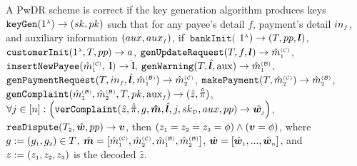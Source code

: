 \begin{definition}[Correctness] A PwDR scheme is correct if the key generation algorithm produces keys $\mathtt{keyGen}(1^{\scriptscriptstyle \lambda})\rightarrow (sk,pk)$ such that for any payee's detail $f$, payment's detail $in_{\scriptscriptstyle f}$, and auxiliary information $(aux, aux_{\scriptscriptstyle f})$, if $\ \mathtt{bankInit}($ $1^{\scriptscriptstyle \lambda})\rightarrow (T, pp, \bm{l})$, $\mathtt{customerInit} (1^{\scriptscriptstyle \lambda}, T, pp)\rightarrow a$, $\mathtt{genUpdateRequest}(T, f, {\bm l})\rightarrow \hat m^{\scriptscriptstyle\mathcal{(C)}}_{\scriptscriptstyle 1}$, $\mathtt{insertNewPayee}(\hat{m}^{\scriptscriptstyle\mathcal{(C)}}_{\scriptscriptstyle 1}, $ ${\bm l})\rightarrow  \hat{\bm l}$, $\mathtt{genWarning}(T, \hat{\bm l}, \text{aux})\rightarrow \hat m^{\scriptscriptstyle\mathcal{(B)}}_{\scriptscriptstyle1}$, $\mathtt{genPaymentRequest}(T, in_{\scriptscriptstyle f}, \hat{\bm{l}}, \hat m^{\scriptscriptstyle\mathcal{(B)}}_{\scriptscriptstyle1})\rightarrow \hat m^{\scriptscriptstyle\mathcal{(C)}}_{\scriptscriptstyle2}$, $\mathtt{makePayment}(T, \hat m^{\scriptscriptstyle\mathcal{(C)}}_{\scriptscriptstyle2})\rightarrow \hat m^{\scriptscriptstyle\mathcal{(B)}}_{\scriptscriptstyle2}$, $\mathtt{genComplaint}(\hat m^{\scriptscriptstyle\mathcal{(B)}}_{\scriptscriptstyle 1}, \hat m^{\scriptscriptstyle\mathcal{(B)}}_{\scriptscriptstyle2}, T, pk, \text{aux}_{\scriptscriptstyle f})\rightarrow (\hat z, \hat{\ddot \pi})$, 
$\forall j\in [n]:\\ \Big(\mathtt{verComplaint}( \hat z, \hat{\ddot{\pi}}, g, \bm{\hat{m}}, \hat{\bm{l}}, j, sk_{\scriptscriptstyle\mathcal D}, aux, pp)\rightarrow \hat{\bm{w}_{\scriptscriptstyle j}}\Big)$, 
 $\mathtt{resDispute}(T_{\scriptscriptstyle 2}, \hat {\bm w}, pp)\rightarrow {\bm v}$, then $(z_{\scriptscriptstyle 1}=z_{\scriptscriptstyle 2}=z_{\scriptscriptstyle 3}=\phi) \wedge({\bm{v}}=\phi)$, where $g:=(g_{\scriptscriptstyle 1}, g_{\scriptscriptstyle 2})\in T$,   $\hat {\bm m}=[\hat {m}^{\scriptscriptstyle (\mathcal{C})}_{\scriptscriptstyle 1}, \hat {m}^{\scriptscriptstyle (\mathcal{C})}_{\scriptscriptstyle 2}, \hat {m}^{\scriptscriptstyle (\mathcal{B})}_{\scriptscriptstyle 1}, \hat {m}^{\scriptscriptstyle (\mathcal{B})}_{\scriptscriptstyle 2}]$,   $\hat {\bm w}=[{\hat{\bm w}}_{\scriptscriptstyle 1},...,{\hat{\bm w}}_{\scriptscriptstyle n}]$,  and $z:=(z_{\scriptscriptstyle 1}, z_{\scriptscriptstyle 2}, z_{\scriptscriptstyle 3})$ is the decoded  $\hat{z}$.
\end{definition}





